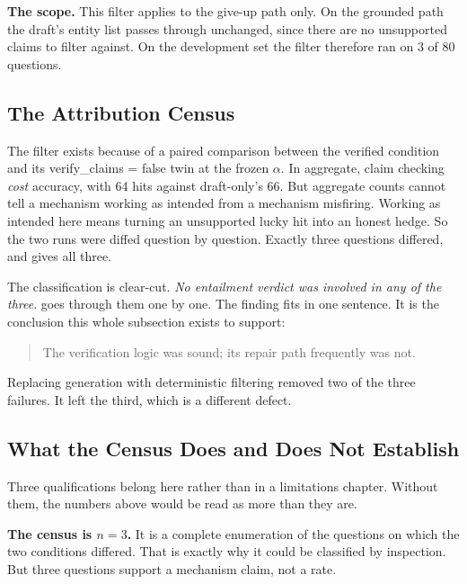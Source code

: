 \textbf{The scope.} This filter applies to the give-up path only. On the
grounded path the draft's entity list passes through unchanged, since there are
no unsupported claims to filter against. On the development set the filter
therefore ran on 3 of 80 questions.

\subsection*{The Attribution Census}

The filter exists because of a paired comparison between the verified condition
and its \textsf{verify\_claims} = false twin at the frozen $\alpha$. In
aggregate, claim checking \emph{cost} accuracy, with 64 hits against
draft-only's 66. But aggregate counts cannot tell a mechanism working as
intended from a mechanism misfiring. Working as intended here means turning an
unsupported lucky hit into an honest hedge. So the two runs were diffed question
by question. Exactly three questions differed, and  gives all
three.

The classification is clear-cut. \emph{No entailment verdict was involved in any
of the three}.  goes through them one by one. The
finding fits in one sentence. It is the conclusion this whole subsection exists
to support:

\begin{quote}
The verification logic was sound; its repair path frequently was not.
\end{quote}

Replacing generation with deterministic filtering removed two of the three
failures. It left the third, which is a different defect.

\subsection*{What the Census Does and Does Not Establish}

Three qualifications belong here rather than in a limitations chapter. Without
them, the numbers above would be read as more than they are.

\textbf{The census is $n = 3$.} It is a complete enumeration of the questions on
which the two conditions differed. That is exactly why it could be classified by
inspection. But three questions support a mechanism claim, not a rate.

